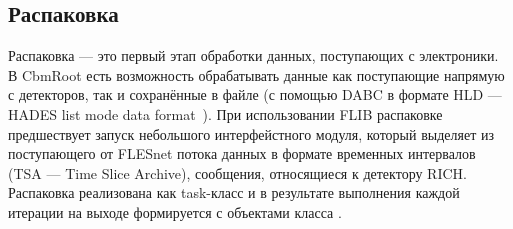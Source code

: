

\subsection{Распаковка}

Распаковка --- это первый этап обработки данных, поступающих с электроники. В CbmRoot есть возможность обрабатывать данные как поступающие напрямую с детекторов, так и сохранённые в файле (с помощью DABC в формате HLD --- HADES list mode data format~\cite{HLD}). При использовании FLIB распаковке предшествует запуск небольшого интерфейстного модуля, который выделяет из поступающего от FLESnet потока данных в формате временных интервалов (TSA --- Time Slice Archive), сообщения, относящиеся к детектору RICH. Распаковка реализована как task-класс  и в результате выполнения каждой итерации на выходе формируется  с объектами класса .

